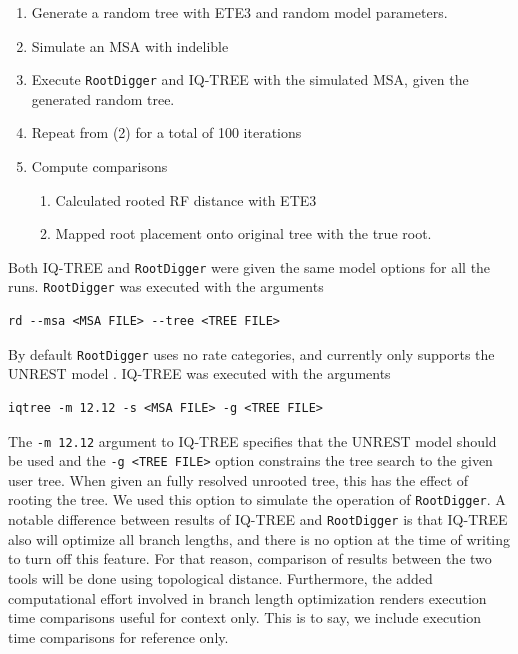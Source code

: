 \documentclass{article}
\newcommand{\RootDiggertt}{\texttt{RootDigger}}
\begin{document}
\begin{enumerate} 
  \item Generate a random tree with ETE3
        \cite{huerta-cepas_ete_2016} and random model parameters.
  \item Simulate an MSA with indelible \cite{fletcher_indelible:_2009}
  \item Execute \RootDiggertt{} and IQ-TREE \cite{minh_iq-tree_2019} with the
    simulated MSA, given the generated random tree.
  \item Repeat from (2) for a total of 100 iterations
  \item Compute comparisons
        \begin{enumerate}
          \item Calculated rooted RF distance with ETE3
                \cite{robinson_comparison_1981}
          \item Mapped root placement onto original tree with the true root.
        \end{enumerate}
\end{enumerate}

Both IQ-TREE and \RootDiggertt{} were given the same model options for all the
runs. \RootDiggertt{} was executed with the arguments

\begin{verbatim}
rd --msa <MSA FILE> --tree <TREE FILE>
\end{verbatim}

By default \RootDiggertt{} uses no rate categories, and currently only supports
the UNREST model \cite{yang_estimating_1994}. IQ-TREE was executed with the
arguments

\begin{verbatim}
iqtree -m 12.12 -s <MSA FILE> -g <TREE FILE>
\end{verbatim}

The \texttt{-m 12.12} argument to IQ-TREE specifies that the UNREST model should
be used \cite{woodhams_new_2015} and the \texttt{-g <TREE FILE>} option
constrains the tree search to the given user tree. When given an fully resolved
unrooted tree, this has the effect of rooting the tree. We used this option to
simulate the operation of \RootDiggertt{}. A notable difference between results
of IQ-TREE and \RootDiggertt{} is that IQ-TREE also will optimize all branch
lengths, and there is no option at the time of writing to turn off this
feature. For that reason, comparison of results between the two tools will be
done using topological distance. Furthermore, the added computational effort
involved in branch length optimization renders execution time comparisons useful
for context only. This is to say, we include execution time comparisons for
reference only.
\end{document}

